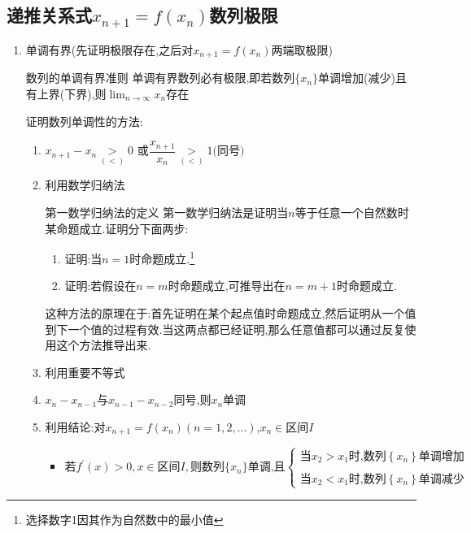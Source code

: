 \documentclass[8pt a4paper, oneside, UTF8]{ctexbook}
\begin{document}
\begin{sloppypar}
    \subsection{递推关系式\texorpdfstring{$x_{n+1}=f(x_n)$}的数列极限}
    \begin{enumerate}
        \item 单调有界(先证明极限存在,之后对$x_{n+1}=f(x_n)$两端取极限)
        \begin{them}{数列的单调有界准则}{}
            单调有界数列必有极限,即若数列$\{x_n\}$单调增加(减少)且有上界(下界),则$\lim_{n \to \infty} x_n$存在
        \end{them}
        证明数列单调性的方法:
            \begin{enumerate}
                \item $x_{n+1}-x_{n}\underset{(<)}{\operatorname*{>}}0\text{ 或}\dfrac{x_{n+1}}{x_{n}}\underset{(<)}{\operatorname*{>}}1\text{(同号})$
                \item 利用数学归纳法
                \begin{defn}{第一数学归纳法的定义}{}
                    第一数学归纳法是证明当$n$等于任意一个自然数时某命题成立.证明分下面两步:
                    \begin{enumerate}
                        \item 证明:当$n=1$时命题成立.\footnote{选择数字1因其作为自然数中的最小值}
                        \item 证明:若假设在$n=m$时命题成立,可推导出在$n=m+1$时命题成立.
                    \end{enumerate}
                    这种方法的原理在于:首先证明在某个起点值时命题成立,然后证明从一个值到下一个值的过程有效.当这两点都已经证明,那么任意值都可以通过反复使用这个方法推导出来.
                \end{defn}
                \item 利用重要不等式
                \item $x_n-x_{n-1}$与$x_{n-1}-x_{n-2}$同号,则${x_n}$单调
                \item 利用结论:对$x_{n+1}=f(x_n)(n=1,2,...)$,$x_n \in \text{区间}I$
                \begin{itemize}
                    \item $\text{若} f^{\prime}(x) > 0, x \in \text{区间}I, \text{则数列} \{x_n\} \text{单调,且}\left\{\begin{array}{l}\text{当}x_2>x_1\text{时,数列}\left\{x_n\right\}\text{单调增加}\\\\\text{当}x_2<x_1\text{时,数列}\left\{x_n\right\}\text{单调减少}\end{array}\right.$

\end{itemize}
\end{enumerate}
\end{enumerate}
\end{sloppypar}
\end{document}
